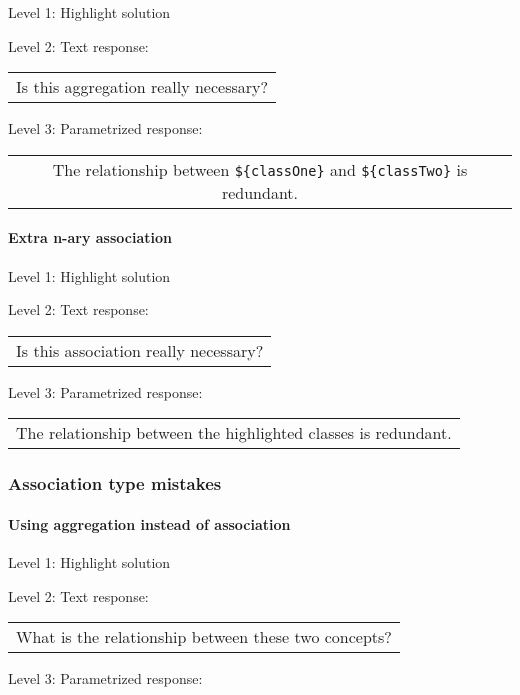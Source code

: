 \noindent Level 1: Highlight solution \medskip

\noindent Level 2: Text response: \medskip

\begin{tabular}{|c}
Is this aggregation really necessary?
\end{tabular} \medskip

\noindent Level 3: Parametrized response: \medskip

\begin{tabular}{|c}
The relationship between \verb|${classOne}| and \verb|${classTwo}| is redundant.
\end{tabular} \medskip


\paragraph{Extra n-ary association}

\noindent Level 1: Highlight solution \medskip

\noindent Level 2: Text response: \medskip

\begin{tabular}{|c}
Is this association really necessary?
\end{tabular} \medskip

\noindent Level 3: Parametrized response: \medskip

\begin{tabular}{|c}
The relationship between the highlighted classes is redundant.
\end{tabular} \medskip


\subsubsection{Association type mistakes}

\paragraph{Using aggregation instead of association}

\noindent Level 1: Highlight solution \medskip

\noindent Level 2: Text response: \medskip

\begin{tabular}{|c}
What is the relationship between these two concepts?
\end{tabular} \medskip

\noindent Level 3: Parametrized response: \medskip

